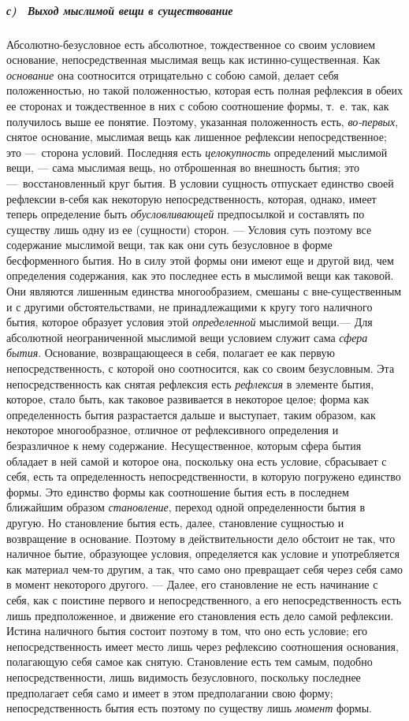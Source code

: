 \subparagraph[с) \ Выход мыслимой вещи в существование]{с) \ Выход мыслимой
вещи в существование}
\hypertarget{Toc478978734}{}Абсолютно-безусловное есть абсолютное,
тождественное со своим условием основание, непосредственная мыслимая вещь
как истинно-существенная. Как {\em основание} она
соотносится отрицательно с собою самой, делает себя положенностью, но такой
положенностью, которая есть полная рефлексия в обеих ее сторонах и
тождественное в них с собою соотношение формы, т.~е. так, как получилось
выше ее понятие. Поэтому, указанная положенность есть,
{\em во-первых}, снятое основание, мыслимая вещь как
лишенное рефлексии непосредственное; это —~сторона условий. Последняя есть
{\em целокупность} определений мыслимой вещи, — сама
мыслимая вещь, но отброшенная во внешность бытия; это —~восстановленный
круг бытия. В условии сущность отпускает единство своей рефлексии в-себя
как некоторую непосредственность, которая, однако, имеет теперь определение
быть {\em обусловливающей} предпосылкой и составлять по
существу лишь одну из ее (сущности) сторон. — Условия суть поэтому все
содержание мыслимой вещи, так как они суть безусловное в форме
бесформенного бытия. Но в силу этой формы они имеют еще и другой вид, чем
определения содержания, как это последнее есть в мыслимой вещи как таковой.
Они являются лишенным единства многообразием, смешаны с вне-существенным и
с другими обстоятельствами, не принадлежащими к кругу того наличного бытия,
которое образует условия этой {\em определенной}
мыслимой вещи.— Для абсолютной неограниченной мыслимой вещи условием служит
сама {\em сфера бытия}. Основание, возвращающееся в
себя, полагает ее как первую непосредственность, с которой оно соотносится,
как со своим безусловным. Эта непосредственность как снятая рефлексия есть
{\em рефлексия} в элементе бытия, которое, стало быть,
как таковое развивается в некоторое целое; форма как определенность бытия
разрастается дальше и выступает, таким образом, как некоторое
многообразное, отличное от рефлексивного определения и безразличное к нему
содержание. Несущественное, которым сфера бытия обладает в ней самой и
которое она, поскольку она есть условие, сбрасывает с себя, есть та
определенность непосредственности, в которую погружено единство формы. Это
единство формы как соотношение бытия есть в последнем ближайшим образом
{\em становление}, переход одной определенности бытия в
другую. Но становление бытия есть, далее, становление сущностью и
возвращение в основание. Поэтому в действительности дело обстоит не так,
что наличное бытие, образующее условия, определяется как условие и
употребляется как материал чем-то другим, а так, что само оно превращает
себя через себя само в момент некоторого другого. — Далее, его становление
не есть начинание с себя, как с поистине первого и непосредственного, а его
непосредственность есть лишь предположенное, и движение его становления
есть дело самой рефлексии. Истина наличного бытия состоит поэтому в том,
что оно есть условие; его непосредственность имеет место лишь через
рефлексию соотношения основания, полагающую себя самое как снятую.
Становление есть тем самым, подобно непосредственности, лишь видимость
безусловного, поскольку последнее предполагает себя само и имеет в этом
предполагании свою форму; непосредственность бытия есть поэтому по существу
лишь {\em момент} формы.

